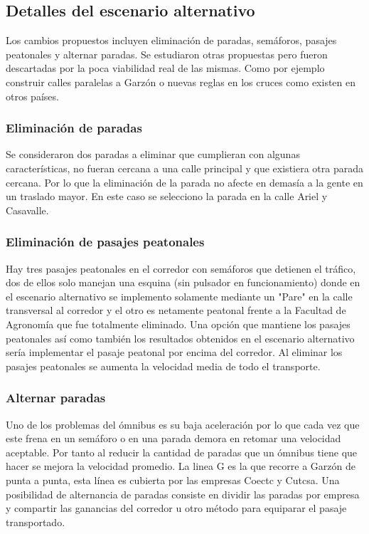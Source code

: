 \subsection{Detalles del escenario alternativo}
Los cambios propuestos incluyen eliminación de paradas, semáforos, pasajes peatonales y alternar paradas. Se estudiaron otras propuestas pero fueron descartadas por la poca viabilidad real de las mismas. Como por ejemplo construir calles paralelas a Garzón o nuevas reglas en los cruces como existen en otros países.




\subsubsection{Eliminación de paradas}
Se consideraron dos paradas a eliminar que cumplieran con algunas características, no fueran cercana a una calle principal y que existiera otra parada cercana. Por lo que la eliminación de la parada no afecte en demasía a la gente en un traslado mayor.
En este caso se selecciono la parada en la calle Ariel y Casavalle.



\subsubsection{Eliminación de pasajes peatonales}
Hay tres pasajes peatonales en el corredor con semáforos que detienen el tráfico, dos de ellos solo manejan una esquina (sin pulsador en funcionamiento) donde en el escenario alternativo se implemento solamente mediante un "Pare" en la calle transversal al corredor y el otro es netamente peatonal frente a la Facultad de Agronomía que fue totalmente eliminado. Una opción que mantiene los pasajes peatonales así como también los resultados obtenidos en el escenario alternativo sería implementar el pasaje peatonal por encima del corredor. Al eliminar los pasajes peatonales se aumenta la velocidad media de todo el transporte.

\subsubsection{Alternar paradas}

Uno de los problemas del ómnibus es su baja aceleración por lo que cada vez que este frena en un semáforo o en una parada demora en retomar una velocidad aceptable. Por tanto al reducir la cantidad de paradas que un ómnibus tiene que hacer se mejora la velocidad promedio.
La linea G es la que recorre a Garzón de punta a punta, esta línea es cubierta por las empresas Coectc y Cutcsa. Una posibilidad de alternancia de paradas consiste en dividir las paradas por empresa y compartir las ganancias del corredor u otro método para equiparar el pasaje transportado. 

